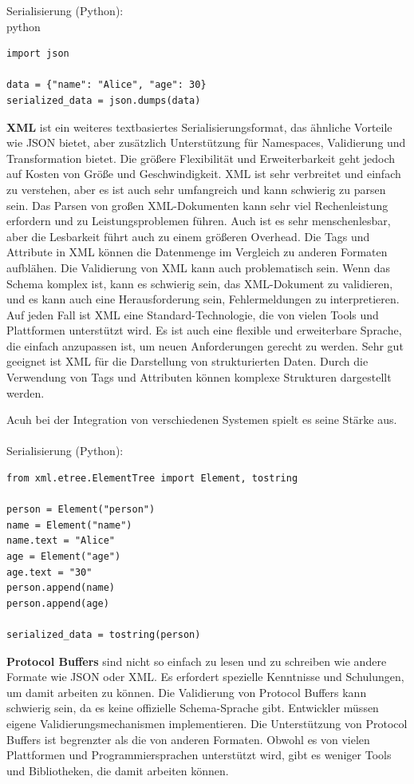 \documentclass[../vs-script-first-v01.tex]{subfiles}
\begin{document}
Serialisierung (Python):\\
python\\
\begin{lstlisting}[caption={JSON},captionpos=b,label={lst:json}]
import json

data = {"name": "Alice", "age": 30}
serialized_data = json.dumps(data)

\end{lstlisting}
\textbf{XML} ist ein weiteres textbasiertes Serialisierungsformat, das ähnliche Vorteile wie JSON bietet, aber zusätzlich Unterstützung für Namespaces, Validierung und Transformation bietet. Die größere Flexibilität und Erweiterbarkeit geht jedoch auf Kosten von Größe und Geschwindigkeit.
XML ist sehr verbreitet und einfach zu verstehen, aber es ist auch sehr umfangreich und kann schwierig zu parsen sein. Das Parsen von großen XML-Dokumenten kann sehr viel Rechenleistung erfordern und zu Leistungsproblemen führen.
Auch ist es sehr menschenlesbar, aber die Lesbarkeit führt auch zu einem größeren Overhead. Die Tags und Attribute in XML können die Datenmenge im Vergleich zu anderen Formaten aufblähen. Die Validierung von XML kann auch problematisch sein. Wenn das Schema komplex ist, kann es schwierig sein, das XML-Dokument zu validieren, und es kann auch eine Herausforderung sein, Fehlermeldungen zu interpretieren. Auf jeden Fall ist XML eine Standard-Technologie, die von vielen Tools und Plattformen unterstützt wird. Es ist auch eine flexible und erweiterbare Sprache, die einfach anzupassen ist, um neuen Anforderungen gerecht zu werden.
Sehr gut geeignet ist XML für die Darstellung von strukturierten Daten. Durch die Verwendung von Tags und Attributen können komplexe Strukturen dargestellt werden.

Acuh bei der Integration von verschiedenen Systemen spielt es seine Stärke aus.\\\\

Serialisierung (Python):\\
\begin{lstlisting}[caption={XML},captionpos=b,label={lst:xml}]
from xml.etree.ElementTree import Element, tostring

person = Element("person")
name = Element("name")
name.text = "Alice"
age = Element("age")
age.text = "30"
person.append(name)
person.append(age)

serialized_data = tostring(person)
\end{lstlisting}
\textbf{Protocol Buffers} sind nicht so einfach zu lesen und zu schreiben wie andere Formate wie JSON oder XML. Es erfordert spezielle Kenntnisse und Schulungen, um damit arbeiten zu können. Die Validierung von Protocol Buffers kann schwierig sein, da es keine offizielle Schema-Sprache gibt. Entwickler müssen eigene Validierungsmechanismen implementieren. Die Unterstützung von Protocol Buffers ist begrenzter als die von anderen Formaten. Obwohl es von vielen Plattformen und Programmiersprachen unterstützt wird, gibt es weniger Tools und Bibliotheken, die damit arbeiten können.
\end{document}
